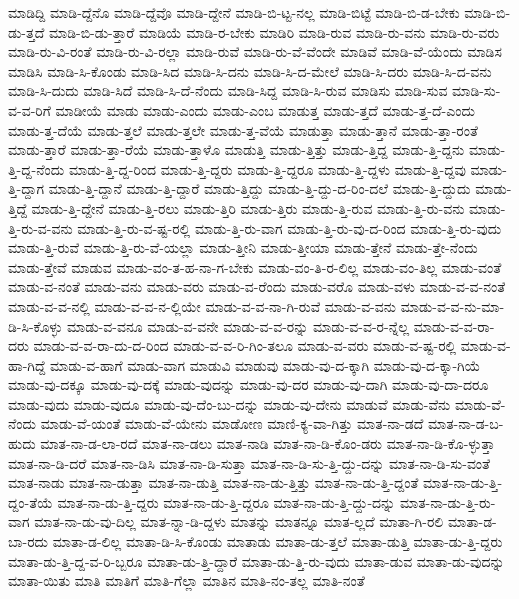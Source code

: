 {ಮಾಡಿದ್ದಿ
ಮಾಡಿ-ದ್ದೆನೊ
ಮಾಡಿ-ದ್ದೆವೊ
ಮಾಡಿ-ದ್ದೇನೆ
ಮಾಡಿ-ಬಿ-ಟ್ಟ-ನಲ್ಲ
ಮಾಡಿ-ಬಿಟ್ಟೆ
ಮಾಡಿ-ಬಿ-ಡ-ಬೇಕು
ಮಾಡಿ-ಬಿ-ಡು-ತ್ತದೆ
ಮಾಡಿ-ಬಿ-ಡು-ತ್ತಾರೆ
ಮಾಡಿಯೆ
ಮಾಡಿ-ರ-ಬೇಕು
ಮಾಡಿರಿ
ಮಾಡಿ-ರುವ
ಮಾಡಿ-ರು-ವನು
ಮಾಡಿ-ರು-ವರು
ಮಾಡಿ-ರು-ವಿ-ರಂತೆ
ಮಾಡಿ-ರು-ವಿ-ರಲ್ಲಾ
ಮಾಡಿ-ರುವೆ
ಮಾಡಿ-ರು-ವೆ-ವೆಂದೇ
ಮಾಡಿವೆ
ಮಾಡಿ-ವೆ-ಯೆಂದು
ಮಾಡಿಸ
ಮಾಡಿಸಿ
ಮಾಡಿ-ಸಿ-ಕೊಂಡು
ಮಾಡಿ-ಸಿದ
ಮಾಡಿ-ಸಿ-ದನು
ಮಾಡಿ-ಸಿ-ದ-ಮೇಲೆ
ಮಾಡಿ-ಸಿ-ದರು
ಮಾಡಿ-ಸಿ-ದ-ವನು
ಮಾಡಿ-ಸಿ-ದುದು
ಮಾಡಿ-ಸಿದೆ
ಮಾಡಿ-ಸಿ-ದೆ-ನೆಂದು
ಮಾಡಿ-ಸಿದ್ದ
ಮಾಡಿ-ಸಿ-ರುವ
ಮಾಡಿಸು
ಮಾಡಿ-ಸುವ
ಮಾಡಿ-ಸು-ವ-ವ-ರಿಗೆ
ಮಾಡೀಯೆ
ಮಾಡು
ಮಾಡು-ಎಂದು
ಮಾಡು-ಎಂಬ
ಮಾಡುತ್ತ
ಮಾಡು-ತ್ತದೆ
ಮಾಡು-ತ್ತ-ದೆ-ಎಂದು
ಮಾಡು-ತ್ತ-ದೆಯೆ
ಮಾಡು-ತ್ತಲೆ
ಮಾಡು-ತ್ತಲೇ
ಮಾಡು-ತ್ತ-ವೆಯೆ
ಮಾಡುತ್ತಾ
ಮಾಡು-ತ್ತಾನೆ
ಮಾಡು-ತ್ತಾ-ರಂತೆ
ಮಾಡು-ತ್ತಾರೆ
ಮಾಡು-ತ್ತಾ-ರೆಯೆ
ಮಾಡು-ತ್ತಾಳೊ
ಮಾಡುತ್ತಿ
ಮಾಡು-ತ್ತಿತ್ತು
ಮಾಡು-ತ್ತಿದ್ದ
ಮಾಡು-ತ್ತಿ-ದ್ದನು
ಮಾಡು-ತ್ತಿ-ದ್ದ-ನೆಂದು
ಮಾಡು-ತ್ತಿ-ದ್ದ-ರಿಂದ
ಮಾಡು-ತ್ತಿ-ದ್ದರು
ಮಾಡು-ತ್ತಿ-ದ್ದರೂ
ಮಾಡು-ತ್ತಿ-ದ್ದಳು
ಮಾಡು-ತ್ತಿ-ದ್ದವು
ಮಾಡು-ತ್ತಿ-ದ್ದಾಗ
ಮಾಡು-ತ್ತಿ-ದ್ದಾನೆ
ಮಾಡು-ತ್ತಿ-ದ್ದಾರೆ
ಮಾಡು-ತ್ತಿದ್ದು
ಮಾಡು-ತ್ತಿ-ದ್ದು-ದ-ರಿಂ-ದಲೆ
ಮಾಡು-ತ್ತಿ-ದ್ದುದು
ಮಾಡು-ತ್ತಿದ್ದೆ
ಮಾಡು-ತ್ತಿ-ದ್ದೇನೆ
ಮಾಡು-ತ್ತಿ-ರಲು
ಮಾಡು-ತ್ತಿರಿ
ಮಾಡು-ತ್ತಿರು
ಮಾಡು-ತ್ತಿ-ರುವ
ಮಾಡು-ತ್ತಿ-ರು-ವನು
ಮಾಡು-ತ್ತಿ-ರು-ವ-ವನು
ಮಾಡು-ತ್ತಿ-ರು-ವ-ಷ್ಟ-ರಲ್ಲಿ
ಮಾಡು-ತ್ತಿ-ರು-ವಾಗ
ಮಾಡು-ತ್ತಿ-ರು-ವು-ದ-ರಿಂದ
ಮಾಡು-ತ್ತಿ-ರು-ವುದು
ಮಾಡು-ತ್ತಿ-ರುವೆ
ಮಾಡು-ತ್ತಿ-ರು-ವೆ-ಯಲ್ಲಾ
ಮಾಡು-ತ್ತೀನಿ
ಮಾಡು-ತ್ತೀಯಾ
ಮಾಡು-ತ್ತೇನೆ
ಮಾಡು-ತ್ತೇ-ನೆಂದು
ಮಾಡು-ತ್ತೇವೆ
ಮಾಡುವ
ಮಾಡು-ವಂ-ತ-ಹ-ನಾ-ಗ-ಬೇಕು
ಮಾಡು-ವಂ-ತಿ-ರ-ಲಿಲ್ಲ
ಮಾಡು-ವಂ-ತಿಲ್ಲ
ಮಾಡು-ವಂತೆ
ಮಾಡು-ವ-ನಂತೆ
ಮಾಡು-ವನು
ಮಾಡು-ವರು
ಮಾಡು-ವ-ರೆಂದು
ಮಾಡು-ವರೊ
ಮಾಡು-ವಳು
ಮಾಡು-ವ-ವ-ನಂತೆ
ಮಾಡು-ವ-ವ-ನಲ್ಲಿ
ಮಾಡು-ವ-ವ-ನ-ಲ್ಲಿಯೇ
ಮಾಡು-ವ-ವ-ನಾ-ಗಿ-ರುವೆ
ಮಾಡು-ವ-ವನು
ಮಾಡು-ವ-ವ-ನು-ಮಾ-ಡಿ-ಸಿ-ಕೊಳ್ಳು
ಮಾಡು-ವ-ವನೂ
ಮಾಡು-ವ-ವನೇ
ಮಾಡು-ವ-ವ-ರನ್ನು
ಮಾಡು-ವ-ವ-ರ-ನ್ನೆಲ್ಲ
ಮಾಡು-ವ-ವ-ರಾ-ದರು
ಮಾಡು-ವ-ವ-ರಾ-ದು-ದ-ರಿಂದ
ಮಾಡು-ವ-ವ-ರಿ-ಗಿಂ-ತಲೂ
ಮಾಡು-ವ-ವರು
ಮಾಡು-ವ-ಷ್ಟ-ರಲ್ಲಿ
ಮಾಡು-ವ-ಹಾ-ಗಿದ್ದೆ
ಮಾಡು-ವ-ಹಾಗೆ
ಮಾಡು-ವಾಗ
ಮಾಡುವಿ
ಮಾಡುವು
ಮಾಡು-ವು-ದ-ಕ್ಕಾಗಿ
ಮಾಡು-ವು-ದ-ಕ್ಕಾ-ಗಿಯೆ
ಮಾಡು-ವು-ದಕ್ಕೂ
ಮಾಡು-ವು-ದಕ್ಕೆ
ಮಾಡು-ವುದನ್ನು
ಮಾಡು-ವು-ದರ
ಮಾಡು-ವು-ದಾಗಿ
ಮಾಡು-ವು-ದಾ-ದರೂ
ಮಾಡು-ವುದು
ಮಾಡು-ವುದೂ
ಮಾಡು-ವು-ದೆಂ-ಬು-ದನ್ನು
ಮಾಡು-ವು-ದೇನು
ಮಾಡುವೆ
ಮಾಡು-ವೆನು
ಮಾಡು-ವೆ-ನೆಂದು
ಮಾಡು-ವೆ-ಯಂತೆ
ಮಾಡು-ವೆ-ಯೇನು
ಮಾಡೋಣ
ಮಾಣಿ-ಕ್ಯ-ವಾ-ಗಿತ್ತು
ಮಾತ-ನಾ-ಡದೆ
ಮಾತ-ನಾ-ಡ-ಬ-ಹುದು
ಮಾತ-ನಾ-ಡ-ಲಾ-ರದೆ
ಮಾತ-ನಾ-ಡಲು
ಮಾತ-ನಾಡಿ
ಮಾತ-ನಾ-ಡಿ-ಕೊಂ-ಡರು
ಮಾತ-ನಾ-ಡಿ-ಕೊ-ಳ್ಳುತ್ತಾ
ಮಾತ-ನಾ-ಡಿ-ದರೆ
ಮಾತ-ನಾ-ಡಿಸಿ
ಮಾತ-ನಾ-ಡಿ-ಸುತ್ತಾ
ಮಾತ-ನಾ-ಡಿ-ಸು-ತ್ತಿ-ದ್ದು-ದನ್ನು
ಮಾತ-ನಾ-ಡಿ-ಸು-ವಂತೆ
ಮಾತ-ನಾಡು
ಮಾತ-ನಾ-ಡುತ್ತಾ
ಮಾತ-ನಾ-ಡುತ್ತಿ
ಮಾತ-ನಾ-ಡು-ತ್ತಿತ್ತು
ಮಾತ-ನಾ-ಡು-ತ್ತಿ-ದ್ದಂತೆ
ಮಾತ-ನಾ-ಡು-ತ್ತಿ-ದ್ದಂ-ತೆಯೆ
ಮಾತ-ನಾ-ಡು-ತ್ತಿ-ದ್ದರು
ಮಾತ-ನಾ-ಡು-ತ್ತಿ-ದ್ದರೂ
ಮಾತ-ನಾ-ಡು-ತ್ತಿ-ದ್ದು-ದನ್ನು
ಮಾತ-ನಾ-ಡು-ತ್ತಿ-ರು-ವಾಗ
ಮಾತ-ನಾ-ಡು-ವು-ದಿಲ್ಲ
ಮಾತ-ನ್ನಾ-ಡಿ-ದ್ದಳು
ಮಾತನ್ನು
ಮಾತನ್ನೂ
ಮಾತ-ಲ್ಲದೆ
ಮಾತಾ-ಗಿ-ರಲಿ
ಮಾತಾ-ಡ-ಬಾ-ರದು
ಮಾತಾ-ಡ-ಲಿಲ್ಲ
ಮಾತಾ-ಡಿ-ಸಿ-ಕೊಂಡು
ಮಾತಾಡು
ಮಾತಾ-ಡು-ತ್ತಲೆ
ಮಾತಾ-ಡುತ್ತಿ
ಮಾತಾ-ಡು-ತ್ತಿ-ದ್ದರು
ಮಾತಾ-ಡು-ತ್ತಿ-ದ್ದ-ವ-ರಿ-ಬ್ಬರೂ
ಮಾತಾ-ಡು-ತ್ತಿ-ದ್ದಾರೆ
ಮಾತಾ-ಡು-ತ್ತಿ-ರು-ವುದು
ಮಾತಾ-ಡುವ
ಮಾತಾ-ಡು-ವುದನ್ನು
ಮಾತಾ-ಯಿತು
ಮಾತಿ
ಮಾತಿಗೆ
ಮಾತಿ-ಗೆಲ್ಲಾ
ಮಾತಿನ
ಮಾತಿ-ನಂ-ತಲ್ಲ
ಮಾತಿ-ನಂತೆ
}
